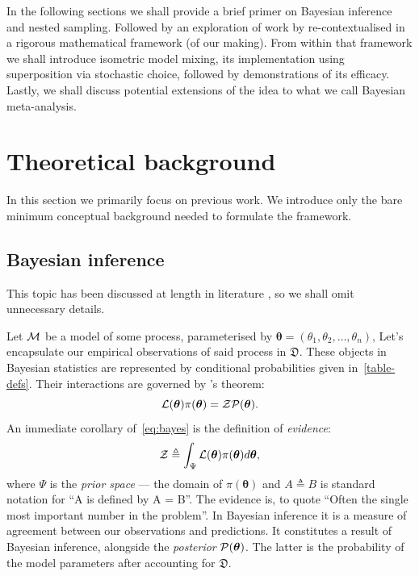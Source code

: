 \documentclass[usenatbib]{mnras}
\begin{document}
In the following sections we shall provide a brief primer on Bayesian
inference and nested sampling. Followed by an exploration of work by
\cite{chen-ferroz-hobson} re-contextualised in a rigorous mathematical
framework (of our making). From within that framework we shall
introduce isometric model mixing, its implementation using
superposition via stochastic choice, followed by demonstrations of its
efficacy. Lastly, we shall discuss potential extensions of the idea to
what we call Bayesian meta-analysis.

\section{Theoretical background}\label{sec:orge6061a4}
In this section we primarily focus on previous work. We introduce only
the bare minimum conceptual background needed to formulate the
framework.

\subsection{Bayesian inference}\label{sec:primer}

This topic has been discussed at length in literature
\citep{jeffreys2010scientific}, so we shall omit unnecessary details.

Let \({\cal M}\) be a model of some process, parameterised by
\(\bm{\theta} = (\theta_{1}, \theta_{2}, \ldots , \theta_{n})\), Let's
encapsulate our empirical observations of said process in
\(\mathfrak{D}\).  These objects in Bayesian statistics are
represented by conditional probabilities given
in~\cref{table-defs}. Their interactions are governed by
\citeauthor{1763}'s theorem:
\begin{equation}\label{eq:bayes} 
 {\cal L}(\bm{\theta})  \pi (\bm{\theta}) = {\cal Z}  {\cal P} (\bm{\theta}).
\end{equation}
An immediate corollary of~\cref{eq:bayes} is the definition of \emph{evidence}:
\begin{equation}\label{eq:def-z}
 {\cal Z} \triangleq \int_{\Psi} {\cal L}(\bm{\theta}) \pi(\bm{\theta}) d\bm{\theta}, 
\end{equation}
where \(\Psi\) is the \emph{prior space} --- the domain of
\(\pi(\bm{\theta})\) and \(A \triangleq B\) is standard notation for
``A is defined by A = B''. The evidence is, to quote
\cite{importanceOfZ} ``Often the single most important number in the
problem''. In Bayesian inference it is a measure of agreement between
our observations and predictions. It constitutes a result of Bayesian
inference, alongside the \emph{posterior} \({\cal
  P}(\bm{\theta})\). The latter is the probability of the model
parameters after accounting for \(\mathfrak{D}\). 
\end{document}
